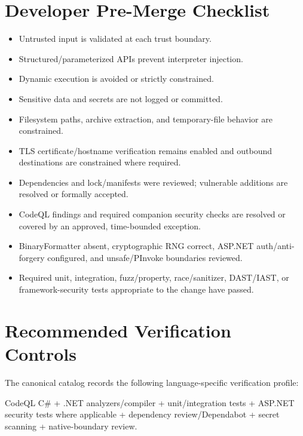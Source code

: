 \documentclass[10pt,letterpaper]{article}
\begin{document}
\section{Developer Pre-Merge Checklist}
\begin{itemize}[leftmargin=*,itemsep=2pt]
\item Untrusted input is validated at each trust boundary.
\item Structured/parameterized APIs prevent interpreter injection.
\item Dynamic execution is avoided or strictly constrained.
\item Sensitive data and secrets are not logged or committed.
\item Filesystem paths, archive extraction, and temporary-file behavior are constrained.
\item TLS certificate/hostname verification remains enabled and outbound destinations are constrained where required.
\item Dependencies and lock/manifests were reviewed; vulnerable additions are resolved or formally accepted.
\item CodeQL findings and required companion security checks are resolved or covered by an approved, time-bounded exception.
\item BinaryFormatter absent, cryptographic RNG correct, ASP.NET auth/anti-forgery configured, and unsafe/PInvoke boundaries reviewed.
\item Required unit, integration, fuzz/property, race/sanitizer, DAST/IAST, or framework-security tests appropriate to the change have passed.
\end{itemize}

\section{Recommended Verification Controls}
The canonical catalog records the following language-specific verification profile:

CodeQL C\# + .NET analyzers/compiler + unit/integration tests + ASP.NET security tests where applicable + dependency review/Dependabot + secret scanning + native-boundary review.
\end{document}
